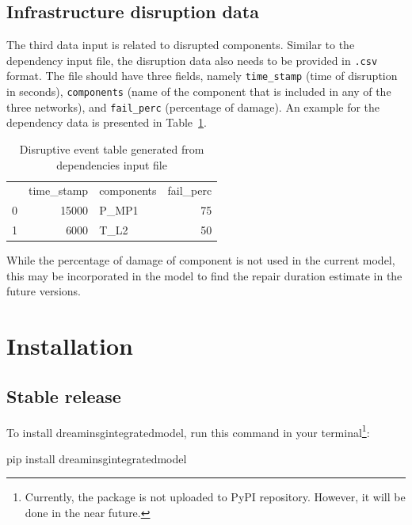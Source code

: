 \documentclass[letterpaper,12pt,english]{sphinxmanual}
\begin{document}
\section{Infrastructure disruption data}
The third data input is related to disrupted components. Similar to the dependency input file, the disruption data also needs to be provided in {\tt *.csv} format. The file should have three fields, namely {\tt time_stamp} (time of disruption in seconds), {\tt components} (name of the component that is included in any of the three networks), and {\tt fail_perc} (percentage of damage). An example for the dependency data is presented in Table~\ref{tab:disruptive_events}.

\begin{table}[h]
	\centering
	\caption{Disruptive event table generated from dependencies input file}
	\begin{tabular}{crlr}
		\multicolumn{1}{l}{} &
		\multicolumn{1}{l}{\cellcolor[HTML]{C0C0C0}time\_stamp} &
		\cellcolor[HTML]{C0C0C0}components &
		\multicolumn{1}{l}{\cellcolor[HTML]{C0C0C0}fail\_perc} \\
		0 &
		\cellcolor[HTML]{FFFFFF}15000 &
		\cellcolor[HTML]{FFFFFF}P\_MP1 &
		\cellcolor[HTML]{FFFFFF}75 \\
		1 &
		\cellcolor[HTML]{EFEFEF}6000 &
		\cellcolor[HTML]{EFEFEF}T\_L2 &
		\cellcolor[HTML]{EFEFEF}50
	\end{tabular}
	\label{tab:disruptive_events}
\end{table}

While the percentage of damage of component is not used in the current model, this may be incorporated in the model to find the repair duration estimate in the future versions.


\chapter{Installation}
\label{\detokenize{index:installation}}

\iffalse
\section{Stable release}
\label{\detokenize{index:stable-release}}
\sphinxAtStartPar
To install dreaminsg\sphinxhyphen{}integrated\sphinxhyphen{}model, run this command in your terminal\footnote{Currently, the package is not uploaded to PyPI repository. However, it will be done in the near future.}:

\begin{sphinxVerbatim}[commandchars=\\\{\}]
pip install dreaminsg\PYGZus{}integrated\PYGZus{}model
\end{sphinxVerbatim}
\end{document}
